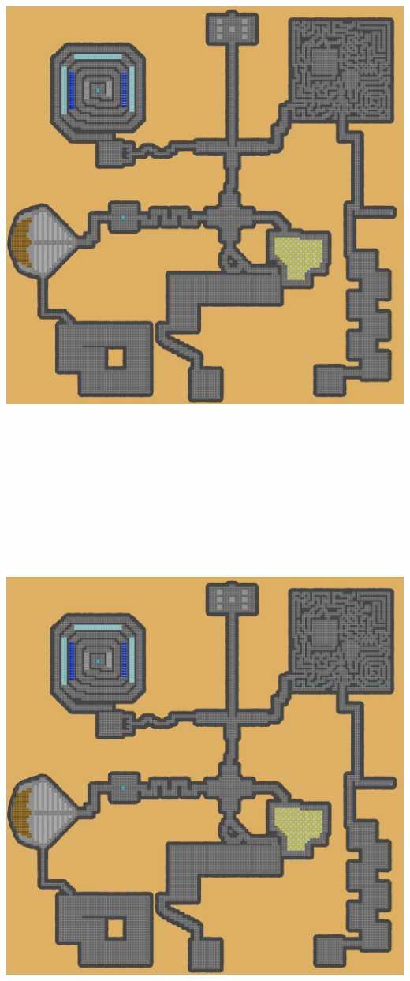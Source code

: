\documentclass[a4paper, landscape]{article}
\begin{document}
\includegraphics[trim = 4287 133 0 4317, clip, height = 19cm, width = 28cm]{Dungeon_playersmap.png}
\clearpage
\includegraphics[trim = 3510 0 777 4550, clip, height = 19cm, width = 28cm]{Dungeon_playersmap.png}
\end{document}
